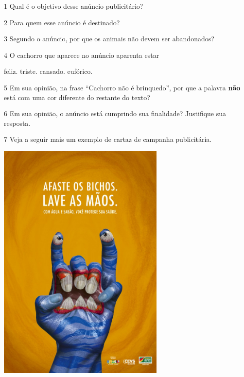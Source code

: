 

\num{1} Qual é o objetivo desse anúncio publicitário? 


\num{2} Para quem esse anúncio é destinado? 


\num{3} Segundo o anúncio, por que os animais não devem ser abandonados? 


\num{4} O cachorro que aparece no anúncio aparenta estar

\begin{boxlist}
  \boxitem[] feliz.
  \boxitem[X] triste.
  \boxitem[] cansado.
  \boxitem[] eufórico.
\end{boxlist}

\num{5} Em sua opinião, na frase ``Cachorro não é brinquedo'', por que a palavra \textbf{não} está com uma cor diferente do restante do texto?


\num{6} Em sua opinião, o anúncio está cumprindo sua finalidade? Justifique
sua resposta. 


\num{7} Veja a seguir mais um exemplo de cartaz de campanha publicitária.


\includegraphics[width=3.27083in,height=4.76432in]{./media/image10.jpeg}

